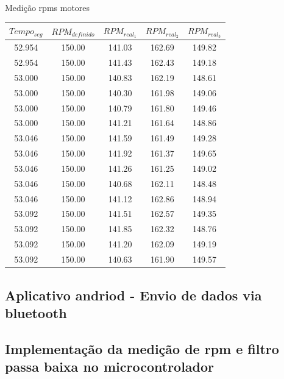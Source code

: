 \begin{quadro}[htb]
	\caption{\label{medicao_motores}Medição rpms motores}
	 \begin{tabular}{|c|c|c|c|c|}
		\hline
		\textbf{$Tempo_{seg}$} & \textbf{$RPM_{definido}$} & \textbf{$RPM_{real_{1}}$} & \textbf{$RPM_{real_{2}}$} & \textbf{$RPM_{real_{3}}$} \\ \hline
		52.954 & 150.00  & 141.03 & 162.69 & 149.82 \\ \hline
		52.954 & 150.00  & 141.43 & 162.43 & 149.18 \\ \hline
		53.000 & 150.00  & 140.83 & 162.19 & 148.61 \\ \hline
		53.000 & 150.00  & 140.30 & 161.98 & 149.06 \\ \hline
		53.000 & 150.00  & 140.79 & 161.80 & 149.46 \\ \hline
		53.000 & 150.00  & 141.21 & 161.64 & 148.86 \\ \hline
		53.046 & 150.00  & 141.59 & 161.49 & 149.28 \\ \hline
		53.046 & 150.00  & 141.92 & 161.37 & 149.65 \\ \hline
		53.046 & 150.00  & 141.26 & 161.25 & 149.02 \\ \hline
		53.046 & 150.00  & 140.68 & 162.11 & 148.48 \\ \hline
		53.046 & 150.00  & 141.12 & 162.86 & 148.94 \\ \hline
		53.092 & 150.00  & 141.51 & 162.57 & 149.35 \\ \hline
		53.092 & 150.00  & 141.85 & 162.32 & 148.76 \\ \hline
		53.092 & 150.00  & 141.20 & 162.09 & 149.19 \\ \hline
		53.092 & 150.00  & 140.63 & 161.90 & 149.57 \\ \hline
	\end{tabular}
\end{quadro}


\subsection{Aplicativo andriod - Envio de dados via bluetooth}



\subsection{Implementação da medição de rpm e filtro passa baixa no microcontrolador}